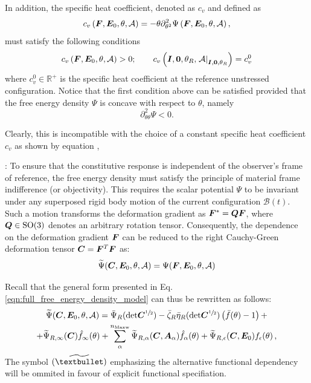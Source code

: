 In addition, the specific heat coefficient, denoted as $c_v$ and defined as
%
\begin{equation}
	c_v\left(\boldsymbol{F},\boldsymbol{E}_0,\theta,\mathcal{A}\right)=-\theta\partial^2_{\theta^2}\Psi\left(\boldsymbol{F},\boldsymbol{E}_0,\theta,\mathcal{A}\right),
\end{equation}
%
must satisfy the following conditions
%
\begin{equation}
	c_v\left(\boldsymbol{F},\boldsymbol{E}_0,\theta,\mathcal{A}\right)>0; \qquad   c_v\left(\boldsymbol{I},\boldsymbol{0},\theta_R,\left.\mathcal{A}\right|_{\boldsymbol{I},\boldsymbol{0},\theta_R}\right)=c_v^0
\end{equation}
%
where $c_v^0\in \mathbb{R}^+$ is the specific heat coefficient at the reference unstressed configuration.  Notice that the first condition above can be satisfied provided that the free energy density $\Psi$ is concave with respect to $\theta$, namely
%
\begin{equation}
	\partial^2_{\theta\theta}\Psi<0.
\end{equation}

%

Clearly, this is incompatible with the choice of a constant
specific heat coefficient $c_v$ as shown by equation ,


\vspace{2mm}
: To ensure that the constitutive response is independent of the observer’s frame of reference, the free energy density must satisfy the principle of material frame indifference (or objectivity). This requires the scalar potential $\Psi$ to be invariant under any superposed rigid body motion of the current configuration $\mathcal{B}(t)$. Such a motion transforms the deformation gradient as $\boldsymbol{F}^* = \boldsymbol{Q}\boldsymbol{F}$, where $\boldsymbol{Q} \in \mathrm{SO}(3)$ denotes an arbitrary rotation tensor. Consequently, the dependence on the deformation gradient $\boldsymbol{F}$ can be reduced to the right Cauchy-Green deformation tensor $\boldsymbol{C} = \boldsymbol{F}^T \boldsymbol{F}$ as:
\begin{equation}
  \widetilde{\Psi}(\boldsymbol{C}, \boldsymbol{E}_0, \theta, \mathcal{A}) = \Psi(\boldsymbol{F}, \boldsymbol{E}_0, \theta, \mathcal{A})
\end{equation}

Recall that the general form presented in Eq. \eqref{eqn:full_free_energy_density_model} can thus be rewritten as follows:
\begin{multline} \label{eqn:full_free_energy_density_model_frame_infiference}
	\widetilde\Psi(\boldsymbol{C},\boldsymbol{E}_0,\theta,\mathcal{A}) =
    \bar\Psi_R(\mathrm{det}\boldsymbol{C}^{\sfrac{1}{2}}) - \bar\zeta_R \bar\eta_R(\mathrm{det}\boldsymbol{C}^{\sfrac{1}{2}}) \left(\bar f(\theta)-1\right) + \\
     + \widetilde\Psi_{R,\infty}(\boldsymbol{C}) \hat f_\infty(\theta) +
      \sum_\alpha^{n_\text{Maxw}} \widetilde\Psi_{R,\alpha}(\boldsymbol{C},\boldsymbol{A}_\alpha) \hat f_\alpha(\theta) +
      \widetilde\Psi_{R,\epsilon}(\boldsymbol{C},\boldsymbol{E}_0) f_\epsilon(\theta) \,,
\end{multline}
The symbol $(\widetilde\textbullet)$ emphasizing the alternative functional dependency will be ommited in favour of explicit functional specifiation.


